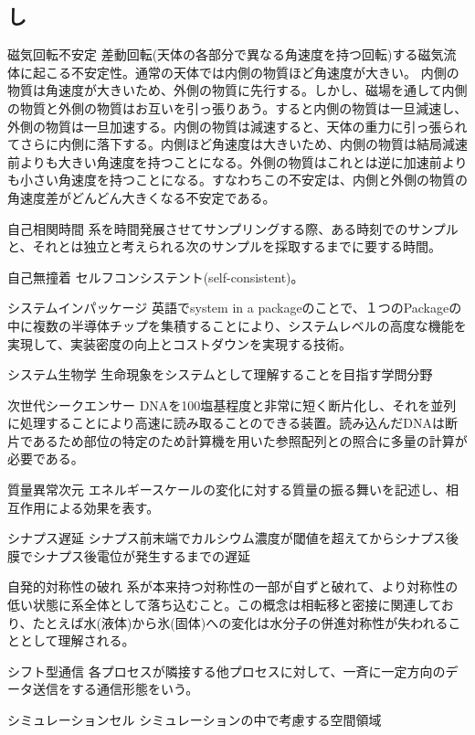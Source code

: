 \begin{用語集}
\section{し}
\item{磁気回転不安定}{}
{差動回転(天体の各部分で異なる角速度を持つ回転)する磁気流体に起こる不安定性。通常の天体では内側の物質ほど角速度が大きい。 内側の物質は角速度が大きいため、外側の物質に先行する。しかし、磁場を通して内側の物質と外側の物質はお互いを引っ張りあう。すると内側の物質は一旦減速し、外側の物質は一旦加速する。内側の物質は減速すると、天体の重力に引っ張られてさらに内側に落下する。内側ほど角速度は大きいため、内側の物質は結局減速前よりも大きい角速度を持つことになる。外側の物質はこれとは逆に加速前よりも小さい角速度を持つことになる。すなわちこの不安定は、内側と外側の物質の角速度差がどんどん大きくなる不安定である。}
\item{自己相関時間}{}
{系を時間発展させてサンプリングする際、ある時刻でのサンプルと、それとは独立と考えられる次のサンプルを採取するまでに要する時間。}
\item{自己無撞着}{}
{セルフコンシステント(self-consistent)。}
\item{システムインパッケージ}{}
{英語でsystem in a packageのことで、１つのPackageの中に複数の半導体チップを集積することにより、システムレベルの高度な機能を実現して、実装密度の向上とコストダウンを実現する技術。}
\item{システム生物学}{}
{生命現象をシステムとして理解することを目指す学問分野}
\item{次世代シークエンサー}{}
{DNAを100塩基程度と非常に短く断片化し、それを並列に処理することにより高速に読み取ることのできる装置。読み込んだDNAは断片であるため部位の特定のため計算機を用いた参照配列との照合に多量の計算が必要である。}
\item{質量異常次元}{}
{エネルギースケールの変化に対する質量の振る舞いを記述し、相互作用による効果を表す。}
\item{シナプス遅延}{}
{シナプス前末端でカルシウム濃度が閾値を超えてからシナプス後膜でシナプス後電位が発生するまでの遅延}
\item{自発的対称性の破れ}{}
{系が本来持つ対称性の一部が自ずと破れて、より対称性の低い状態に系全体として落ち込むこと。この概念は相転移と密接に関連しており、たとえば水(液体)から氷(固体)への変化は水分子の併進対称性が失われることとして理解される。}
\item{シフト型通信}{}
{各プロセスが隣接する他プロセスに対して、一斉に一定方向のデータ送信をする通信形態をいう。}
\item{シミュレーションセル}{}
{シミュレーションの中で考慮する空間領域}

\end{用語集}
